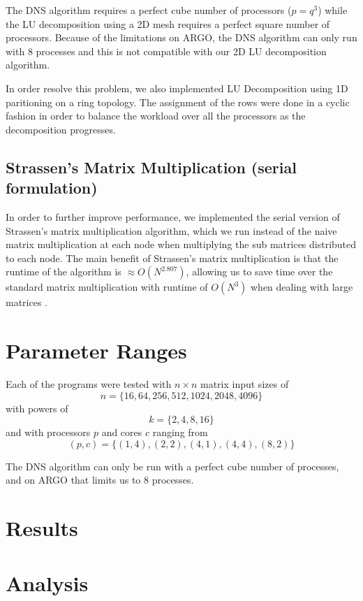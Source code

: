 \documentclass{article}
\begin{document}
The DNS algorithm requires a perfect cube number of processors ($p = q^3$) while
the LU decomposition using a 2D mesh requires a perfect square number of
processors.  Because of the limitations on ARGO, the DNS algorithm can only run
with 8 processes and this is not compatible with our 2D LU decomposition
algorithm.

In order resolve this problem, we also implemented LU Decomposition using 1D
paritioning on a ring topology.  The assignment of the rows were done in a
cyclic fashion in order to balance the workload over all the processors as the
decomposition progresses.

\subsection{Strassen's Matrix Multiplication (serial formulation)}

In order to further improve performance, we implemented the serial version of
Strassen's matrix multiplication algorithm, which we run instead of the naive
matrix multiplication at each node when multiplying the sub matrices distributed
to each node.  The main benefit of Strassen's matrix multiplication is that the
runtime of the algorithm is $\approx O(N^{2.807})$, allowing us to save time
over the standard matrix multiplication with runtime of $O(N^3)$ when dealing
with large matrices .

\section{Parameter Ranges}

Each of the programs were tested with $n \times n$ matrix input sizes of $$n =
\{ 16, 64, 256, 512, 1024, 2048, 4096 \}$$ with powers of $$k=\{ 2, 4, 8,
16 \}$$ and with processors $p$ and cores $c$ ranging from $$(p,c) = \{ (1,4),
(2,2), (4,1), (4,4), (8,2) \}$$

The DNS algorithm can only be run with a perfect cube number of processes, and
on ARGO that limits us to 8 processes.

\section{Results}



\section{Analysis}
\end{document}
